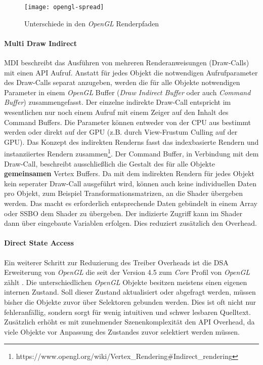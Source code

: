 \begin{figure}
	\texttt{[image: opengl-spread]}
	\caption[Unterschiede in den \textit{OpenGL} Renderpfaden]{Unterschiede in den \textit{OpenGL} Renderpfaden \parencite[Seite 98]{Everitt2014}}
	\label{fig:opengl-pfade}
\end{figure}

\paragraph{Multi Draw Indirect} 
\ac{MDI} beschreibt das Ausführen von mehreren Renderanweisungen (Draw-Calls) mit einen \ac{API} Aufruf. Anstatt für jedes Objekt die notwendigen Aufrufparameter des Draw-Calls separat anzugeben, werden die für alle Objekte notwendigen Parameter in einem \textit{OpenGL} Buffer (\textit{Draw Indirect Buffer} oder auch \textit{Command Buffer}) zusammengefasst. Der einzelne indirekte Draw-Call entspricht im wesentlichen nur noch einem Aufruf mit einem Zeiger auf den Inhalt des Command Buffers. Die Parameter können entweder von der CPU aus bestimmt werden oder direkt auf der GPU (z.B. durch View-Frustum Culling auf der GPU). Das Konzept des indirekten Renderns fasst das indexbasierte Rendern und instanziiertes Rendern zusammen\footnote{https://www.opengl.org/wiki/Vertex\_Rendering\#Indirect\_rendering}. Der Command Buffer, in Verbindung mit dem Draw-Call, beschreibt ausschließlich die Gestalt des für alle Objekte \textbf{gemeinsamen} Vertex Buffers. Da mit dem indirekten Rendern für jedes Objekt kein seperater Draw-Call ausgeführt wird, können auch keine individuellen Daten pro Objekt, zum Beispiel Transformationsmatrizen, an die Shader übergeben werden. Das macht es erforderlich entsprechende Daten gebündelt in einem Array oder \ac{SSBO} dem Shader zu übergeben. Der indizierte Zugriff kann im Shader dann über eingebaute Variablen erfolgen. Dies reduziert zusätzlich den Overhead.

\paragraph{Direct State Access} Ein weiterer Schritt zur Reduzierung des Treiber Overheads ist die \ac{DSA} Erweiterung von \textit{OpenGL} die seit der Version 4.5 zum \textit{Core} Profil von \textit{OpenGL} zählt \parencite{Akeley2015}. Die unterschiedlichen \textit{OpenGL} Objekte besitzen meistens einen eigenen internen Zustand. Soll dieser Zustand aktualisiert oder abgefragt werden, müssen bisher die Objekte zuvor über Selektoren gebunden werden. Dies ist oft nicht nur fehleranfällig, sondern sorgt für wenig intuitiven und schwer lesbaren Quelltext. Zusätzlich erhöht es mit zunehmender Szenenkomplexität den \ac{API} Overhead, da viele Objekte vor Anpassung des Zustandes zuvor selektiert werden müssen.

